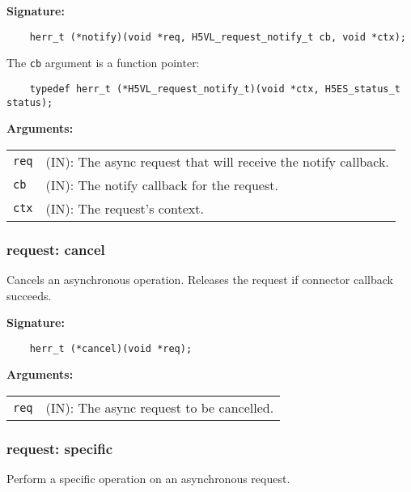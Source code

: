 \begin{mdframed}[style=bgbox]
\textbf{Signature:}
\begin{lstlisting}
    herr_t (*notify)(void *req, H5VL_request_notify_t cb, void *ctx);            
\end{lstlisting}

The \texttt{cb} argument is a function pointer:
\begin{lstlisting}
    typedef herr_t (*H5VL_request_notify_t)(void *ctx, H5ES_status_t status);
\end{lstlisting} 

\textbf{Arguments:}\\
\begin{tabular}{l p{13.5cm}}
  \texttt{req} & (IN): The async request that will receive the notify callback.\\
  \texttt{cb} & (IN): The notify callback for the request.\\
  \texttt{ctx} & (IN): The request's context.\\
\end{tabular}
\end{mdframed}

\subsubsection{request: cancel}
Cancels an asynchronous operation. Releases the request if connector callback succeeds.

\begin{mdframed}[style=bgbox]
\textbf{Signature:}
\begin{lstlisting}
    herr_t (*cancel)(void *req);                                                 
\end{lstlisting}

\textbf{Arguments:}\\
\begin{tabular}{l p{13.5cm}}
  \texttt{req} & (IN): The async request to be cancelled.\\
\end{tabular}
\end{mdframed}

\subsubsection{request: specific}
Perform a specific operation on an asynchronous request.

